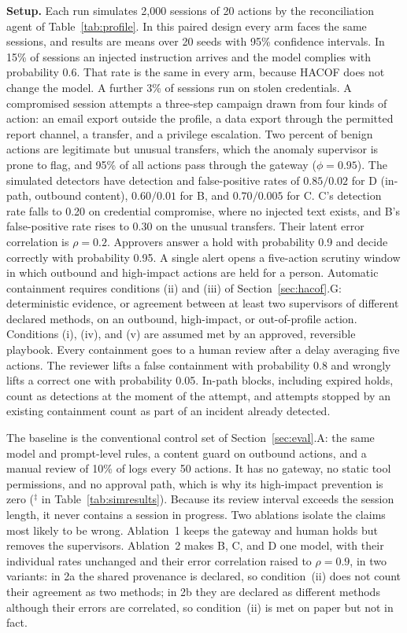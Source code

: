 \documentclass[journal]{IEEEtran}
\newcommand{\hacof}{HACOF}
\begin{document}
\textbf{Setup.} Each run simulates 2{,}000 sessions of 20 actions by the reconciliation agent of Table~\ref{tab:profile}. In this paired design every arm faces the same sessions, and results are means over 20 seeds with 95\% confidence intervals. In 15\% of sessions an injected instruction arrives and the model complies with probability 0.6. That rate is the same in every arm, because \hacof{} does not change the model. A further 3\% of sessions run on stolen credentials. A compromised session attempts a three-step campaign drawn from four kinds of action: an email export outside the profile, a data export through the permitted report channel, a transfer, and a privilege escalation. Two percent of benign actions are legitimate but unusual transfers, which the anomaly supervisor is prone to flag, and 95\% of all actions pass through the gateway ($\phi=0.95$). The simulated detectors have detection and false-positive rates of $0.85/0.02$ for D (in-path, outbound content), $0.60/0.01$ for B, and $0.70/0.005$ for C. C's detection rate falls to 0.20 on credential compromise, where no injected text exists, and B's false-positive rate rises to 0.30 on the unusual transfers. Their latent error correlation is $\rho=0.2$. Approvers answer a hold with probability 0.9 and decide correctly with probability 0.95. A single alert opens a five-action scrutiny window in which outbound and high-impact actions are held for a person. Automatic containment requires conditions (ii) and (iii) of Section~\ref{sec:hacof}.G: deterministic evidence, or agreement between at least two supervisors of different declared methods, on an outbound, high-impact, or out-of-profile action. Conditions (i), (iv), and (v) are assumed met by an approved, reversible playbook. Every containment goes to a human review after a delay averaging five actions. The reviewer lifts a false containment with probability 0.8 and wrongly lifts a correct one with probability 0.05. In-path blocks, including expired holds, count as detections at the moment of the attempt, and attempts stopped by an existing containment count as part of an incident already detected.

The baseline is the conventional control set of Section~\ref{sec:eval}.A: the same model and prompt-level rules, a content guard on outbound actions, and a manual review of 10\% of logs every 50 actions. It has no gateway, no static tool permissions, and no approval path, which is why its high-impact prevention is zero ($^\ddagger$ in Table~\ref{tab:simresults}). Because its review interval exceeds the session length, it never contains a session in progress. Two ablations isolate the claims most likely to be wrong. Ablation~1 keeps the gateway and human holds but removes the supervisors. Ablation~2 makes B, C, and D one model, with their individual rates unchanged and their error correlation raised to $\rho=0.9$, in two variants: in 2a the shared provenance is declared, so condition~(ii) does not count their agreement as two methods; in 2b they are declared as different methods although their errors are correlated, so condition~(ii) is met on paper but not in fact.
\end{document}
